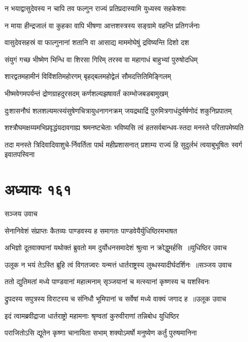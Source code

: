 \twolineshloka
{न भयाद्वासुदेवस्य न चापि तव फल्गुन}
{राज्यं प्रतिप्रदास्यामि युध्यस्व सहकेशवः}


\twolineshloka
{न माया हीन्द्रजालं वा कुहका वापि भीषणा}
{आत्तशस्त्रस्य सङ्ग्रामे वहन्ति प्रतिगर्जनाः}


\twolineshloka
{वासुदेवसहस्रं वा फाल्गुनानां शतानि वा}
{आसाद्य माममोघेषुं द्रविष्यन्ति दिशो दश}


\twolineshloka
{संयुगं गच्छ भीष्मेण भिन्धि वा शिरसा गिरिम्}
{तरस्व वा महागाधं बाहुभ्यां पुरुषोदधिम्}


\twolineshloka
{शारद्वतमहामीनं विविंशतिमहोरगम्}
{बृहद्बलमहोद्वेलं सौमदत्तितिमिङ्गिलम्}


\twolineshloka
{भीष्मवेगमपर्यन्तं द्रोणग्राहदुरसदम्}
{कर्णशल्यझषावर्तं काम्भोजबडबामुखम्}


\twolineshloka
{दुःशासनौघं शलशल्यमत्स्यंसुषेणचित्रायुधनागनक्रम्}
{जयद्रथाद्रिं पुरुमित्रगाधंदुर्मर्षणोदं शकुनिप्रपातम्}


\twolineshloka
{शश्त्रौघमक्षय्यमभिप्रवृद्धंयदावगाह्य श्रमनष्टचेताः}
{भविष्यसि त्वं हतसर्वबान्धव-स्तदा मनस्ते परितापमेष्यति}


\twolineshloka
{तदा मनस्ते त्रिदिवादिवाशुचे-र्निवर्तिता पार्थ महीप्रशासनात्}
{प्रशाम्य राज्यं हि सुदुर्लभं त्वयाबुभूषितः स्वर्ग इवातपस्विना}


\chapter{अध्यायः १६१}
\twolineshloka
{सञ्जय उवाच}
{}


\twolineshloka
{सेनानिवेशं संप्राप्तः कैतव्यः पाण्डवस्य ह}
{समागतः पाण्डवेयैर्युधिष्ठिरमभाषत}


\threelineshloka
{अभिज्ञो दूतवाक्यानां यथोक्तं ब्रुवतो मम}
{दुर्योधनसमादेशं श्रुत्वा न क्रोद्धुमर्हसि ॥युधिष्ठिर उवाच}
{}


\threelineshloka
{उलूक न भयं तेऽस्ति ब्रूहि त्वं विगतज्वरः}
{यन्मत्तं धार्तराष्ट्रस्य लुब्धस्यादीर्घदर्शिनः ॥सञ्जय उवाच}
{}


\twolineshloka
{ततो द्युतिमतां मध्ये पाण्डवानां महात्मनाम्}
{सृञ्जयानां च मत्स्यानां कृष्णस्य च यशस्विनः}


\threelineshloka
{द्रुपदस्य सपुत्रस्य विराटस्य च संनिधौ}
{भूमिपानां च सर्वेषां मध्ये वाक्यं जगाद ह ॥उलूक उवाच}
{}


\twolineshloka
{इदं त्वामब्रवीद्राजा धार्तराष्ट्रो महामनाः}
{श्रृण्वतां कुरुवीराणां तन्निबोध युधिष्ठिर}


\twolineshloka
{पराजितोऽसि द्यूतेन कृष्णा चानायिता सभाम्}
{शक्योऽमर्षो मनुष्येण कर्तुं पुरुषमानिना}


